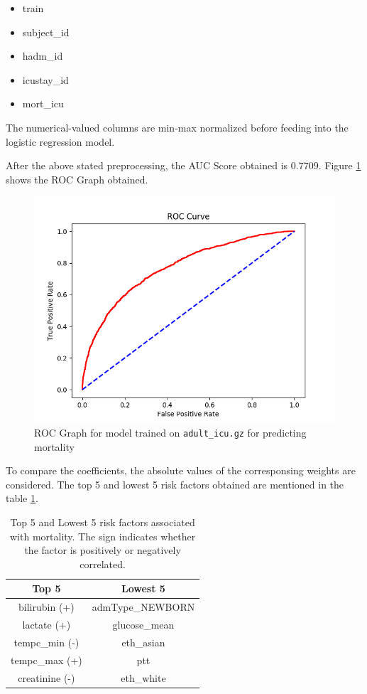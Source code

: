 \documentclass[]{article}
\begin{document}
\begin{itemize}
	\item train
	\item subject\_id
	\item hadm\_id
	\item icustay\_id
	\item mort\_icu
\end{itemize}

The numerical-valued columns are min-max normalized before feeding into the logistic regression model. 

After the above stated preprocessing, the AUC Score obtained is $0.7709$. Figure \ref{fig:roc2a} shows the ROC Graph obtained.

\begin{figure}
	\centering
	\includegraphics[width=0.8\linewidth]{ROC_part2a.png}
	\caption{ROC Graph for model trained on \texttt{adult\_icu.gz} for predicting mortality}
	\label{fig:roc2a}
\end{figure}

To compare the coefficients, the absolute values of the corresponsing weights are considered. The top 5 and lowest 5 risk factors obtained are mentioned in the table \ref{tab:2a}.

\begin{table}[t]
	\centering
	\begin{tabular}{|c|c|}
		\hline
		\textbf{Top 5} & \textbf{Lowest 5}\\
		\hline
		bilirubin (+) & admType\_NEWBORN\\
		lactate (+) & glucose\_mean\\
		tempc\_min (-) & eth\_asian\\
		tempc\_max (+) & ptt\\
		creatinine (-) & eth\_white\\
		\hline
	\end{tabular}
	\caption{Top 5 and Lowest 5 risk factors associated with mortality. The sign indicates whether the factor is positively or negatively correlated.}
	\label{tab:2a}
\end{table}
\end{document}
